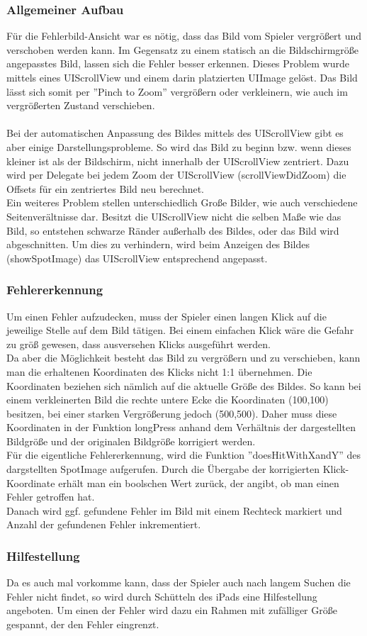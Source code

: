 \subsubsection{Allgemeiner Aufbau}
Für die Fehlerbild-Ansicht war es nötig, dass das Bild vom Spieler vergrößert und verschoben werden kann.
Im Gegensatz zu einem statisch an die Bildschirmgröße angepasstes Bild, lassen sich die Fehler besser erkennen.
Dieses Problem wurde mittels eines UIScrollView und einem darin platzierten UIImage gelöst.
Das Bild lässt sich somit per ''Pinch to Zoom'' vergrößern oder verkleinern, wie auch im vergrößerten Zustand verschieben.\\
\\
Bei der automatischen Anpassung des Bildes mittels des UIScrollView gibt es aber einige Darstellungsprobleme.
So wird das Bild zu beginn bzw. wenn dieses kleiner ist als der Bildschirm, nicht innerhalb der UIScrollView zentriert.
Dazu wird per Delegate bei jedem Zoom der UIScrollView (scrollViewDidZoom) die Offsets für ein zentriertes Bild neu berechnet.\\
Ein weiteres Problem stellen unterschiedlich Große Bilder, wie auch verschiedene Seitenverältnisse dar. Besitzt die UIScrollView
nicht die selben Maße wie das Bild, so entstehen schwarze Ränder außerhalb des Bildes, oder das Bild wird abgeschnitten.
Um dies zu verhindern, wird beim Anzeigen des Bildes (showSpotImage) das UIScrollView entsprechend angepasst.\\

\subsubsection{Fehlererkennung}
Um einen Fehler aufzudecken, muss der Spieler einen langen Klick auf die jeweilige Stelle auf dem Bild tätigen.
Bei einem einfachen Klick wäre die Gefahr zu größ gewesen, dass ausversehen Klicks ausgeführt werden.\\
Da aber die Möglichkeit besteht das Bild zu vergrößern und zu verschieben, kann man die erhaltenen Koordinaten
des Klicks nicht 1:1 übernehmen. Die Koordinaten beziehen sich nämlich auf die aktuelle Größe des Bildes. So kann bei
einem verkleinerten Bild die rechte untere Ecke die Koordinaten (100,100) besitzen, bei einer starken Vergrößerung
jedoch (500,500). Daher muss diese Koordinaten in der Funktion longPress anhand dem Verhältnis der dargestellten
Bildgröße und der originalen Bildgröße korrigiert werden.\\
Für die eigentliche Fehlererkennung, wird die Funktion ''doesHitWithXandY'' des dargstellten SpotImage aufgerufen. Durch
die Übergabe der korrigierten Klick-Koordinate erhält man ein boolschen Wert zurück, der angibt, ob man einen Fehler getroffen hat.\\
Danach wird ggf. gefundene Fehler im Bild mit einem Rechteck markiert und Anzahl der gefundenen Fehler inkrementiert.

\subsubsection{Hilfestellung}
Da es auch mal vorkomme kann, dass der Spieler auch nach langem Suchen die Fehler nicht findet,
so wird durch Schütteln des iPads eine Hilfestellung angeboten. Um einen der Fehler wird dazu ein Rahmen mit zufälliger Größe gespannt, der den Fehler eingrenzt.

